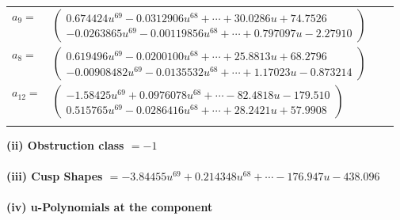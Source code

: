 \documentclass[1p]{elsarticle_modified}
\theoremstyle{definition}
\begin{document}
\begin{tabular}{m{7pt} m{180pt} m{7pt} m{180pt} }
\flushright $a_{9}=$&$\begin{pmatrix}0.674424 u^{69}-0.0312906 u^{68}+\cdots+30.0286 u+74.7526\\-0.0263865 u^{69}-0.00119856 u^{68}+\cdots+0.797097 u-2.27910\end{pmatrix}$ \\
\flushright $a_{8}=$&$\begin{pmatrix}0.619496 u^{69}-0.0200100 u^{68}+\cdots+25.8813 u+68.2796\\-0.00908482 u^{69}-0.0135532 u^{68}+\cdots+1.17023 u-0.873214\end{pmatrix}$ \\
\flushright $a_{12}=$&$\begin{pmatrix}-1.58425 u^{69}+0.0976078 u^{68}+\cdots-82.4818 u-179.510\\0.515765 u^{69}-0.0286416 u^{68}+\cdots+28.2421 u+57.9908\end{pmatrix}$\\&\end{tabular}
\flushleft \textbf{(ii) Obstruction class $= -1$}\\~\\
\flushleft \textbf{(iii) Cusp Shapes $= -3.84455 u^{69}+0.214348 u^{68}+\cdots-176.947 u-438.096$}\\~\\
\newpage\renewcommand{\arraystretch}{1}
\flushleft \textbf{(iv) u-Polynomials at the component}\newline \\
\end{document}
